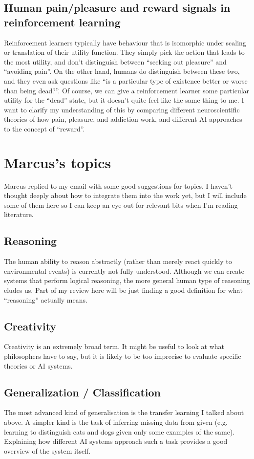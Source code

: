 \documentclass[10pt,a4paper]{article}
\newcommand{\nquote}[1]{``{#1}''}
\begin{document}
\subsection{Human pain/pleasure and reward signals in reinforcement learning}
Reinforcement learners typically have behaviour that is isomorphic under scaling or translation of their utility function. They simply pick the action that leads to the most utility, and don't distinguish between \nquote{seeking out pleasure} and \nquote{avoiding pain}. On the other hand, humans do distinguish between these two, and they even ask questions like \nquote{is a particular type of existence better or worse than being dead?}. Of course, we can give a reinforcement learner some particular utility for the \nquote{dead} state, but it doesn't quite feel like the same thing to me. I want to clarify my understanding of this by comparing different neuroscientific theories of how pain, pleasure, and addiction work, and different AI approaches to the concept of \nquote{reward}.

\section{Marcus's topics}
Marcus replied to my email with some good suggestions for topics. I haven't thought deeply about how to integrate them into the work yet, but I will include some of them here so I can keep an eye out for relevant bits when I'm reading literature.

\subsection{Reasoning}
The human ability to reason abstractly (rather than merely react quickly to environmental events) is currently not fully understood. Although we can create systems that perform logical reasoning, the more general human type of reasoning eludes us. Part of my review here will be just finding a good definition for what \nquote{reasoning} actually means.

\subsection{Creativity}
Creativity is an extremely broad term. It might be useful to look at what philosophers have to say, but it is likely to be too imprecise to evaluate specific theories or AI systems.

\subsection{Generalization / Classification}
The most advanced kind of generalisation is the transfer learning I talked about above. A simpler kind is the task of inferring missing data from given (e.g. learning to distinguish cats and dogs given only some examples of the same). Explaining how different AI systems approach such a task provides a good overview of the system itself.
\end{document}
